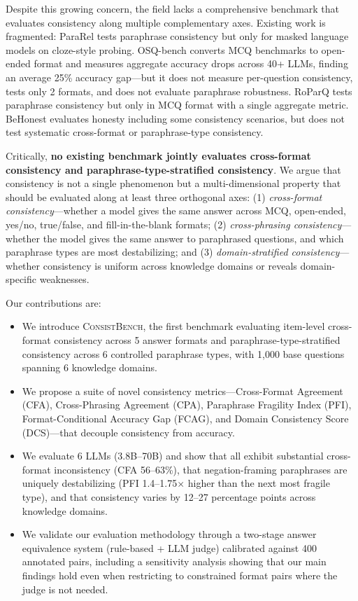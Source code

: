 \documentclass{article}
\newcommand{\consistbench}{\textsc{ConsistBench}}
\begin{document}
Despite this growing concern, the field lacks a comprehensive benchmark that evaluates consistency along multiple complementary axes. Existing work is fragmented: ParaRel \citep{elazar2021measuring} tests paraphrase consistency but only for masked language models on cloze-style probing. OSQ-bench \citep{myrzakhan2024openllmleaderboard} converts MCQ benchmarks to open-ended format and measures aggregate accuracy drops across 40+ LLMs, finding an average 25\% accuracy gap---but it does not measure per-question consistency, tests only 2 formats, and does not evaluate paraphrase robustness. RoParQ \citep{choi2025roparq} tests paraphrase consistency but only in MCQ format with a single aggregate metric. BeHonest \citep{chern2024behonest} evaluates honesty including some consistency scenarios, but does not test systematic cross-format or paraphrase-type consistency.

Critically, \textbf{no existing benchmark jointly evaluates cross-format consistency and paraphrase-type-stratified consistency}. We argue that consistency is not a single phenomenon but a multi-dimensional property that should be evaluated along at least three orthogonal axes: (1) \emph{cross-format consistency}---whether a model gives the same answer across MCQ, open-ended, yes/no, true/false, and fill-in-the-blank formats; (2) \emph{cross-phrasing consistency}---whether the model gives the same answer to paraphrased questions, and which paraphrase types are most destabilizing; and (3) \emph{domain-stratified consistency}---whether consistency is uniform across knowledge domains or reveals domain-specific weaknesses.

Our contributions are:
\begin{itemize}
    \item We introduce \consistbench{}, the first benchmark evaluating item-level cross-format consistency across 5 answer formats and paraphrase-type-stratified consistency across 6 controlled paraphrase types, with 1,000 base questions spanning 6 knowledge domains.
    \item We propose a suite of novel consistency metrics---Cross-Format Agreement (CFA), Cross-Phrasing Agreement (CPA), Paraphrase Fragility Index (PFI), Format-Conditional Accuracy Gap (FCAG), and Domain Consistency Score (DCS)---that decouple consistency from accuracy.
    \item We evaluate 6 LLMs (3.8B--70B) and show that all exhibit substantial cross-format inconsistency (CFA 56--63\%), that negation-framing paraphrases are uniquely destabilizing (PFI 1.4--1.75$\times$ higher than the next most fragile type), and that consistency varies by 12--27 percentage points across knowledge domains.
    \item We validate our evaluation methodology through a two-stage answer equivalence system (rule-based + LLM judge) calibrated against 400 annotated pairs, including a sensitivity analysis showing that our main findings hold even when restricting to constrained format pairs where the judge is not needed.
\end{itemize}
\end{document}
